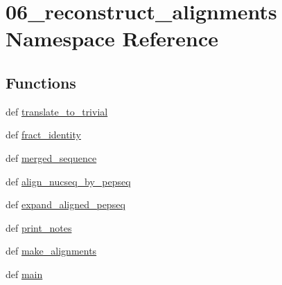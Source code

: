 \hypertarget{namespace06__reconstruct__alignments}{\section{06\-\_\-reconstruct\-\_\-alignments Namespace Reference}
\label{namespace06__reconstruct__alignments}
}
\subsection*{Functions}
\begin{DoxyCompactItemize}
\item 
def \hyperlink{namespace06__reconstruct__alignments_a06b5e809dbf00a2b306e134dc2d7aa8a}{translate\-\_\-to\-\_\-trivial}
\item 
def \hyperlink{namespace06__reconstruct__alignments_ab0c8f2f192c154ff5262067d16509312}{fract\-\_\-identity}
\item 
def \hyperlink{namespace06__reconstruct__alignments_a4353cf09066cac44249567007ac97363}{merged\-\_\-sequence}
\item 
def \hyperlink{namespace06__reconstruct__alignments_ac8f6c6cfa49162a99d41f892651b8104}{align\-\_\-nucseq\-\_\-by\-\_\-pepseq}
\item 
def \hyperlink{namespace06__reconstruct__alignments_a6ac1969c80b126339217d639ede84ed8}{expand\-\_\-aligned\-\_\-pepseq}
\item 
def \hyperlink{namespace06__reconstruct__alignments_aa1e7de847b48c4db41cfb1b20a080c29}{print\-\_\-notes}
\item 
def \hyperlink{namespace06__reconstruct__alignments_a448266142413b7c20a2c9318f94afdd7}{make\-\_\-alignments}
\item 
def \hyperlink{namespace06__reconstruct__alignments_a275d31f1f804039829052ec7f21867c9}{main}
\end{DoxyCompactItemize}


